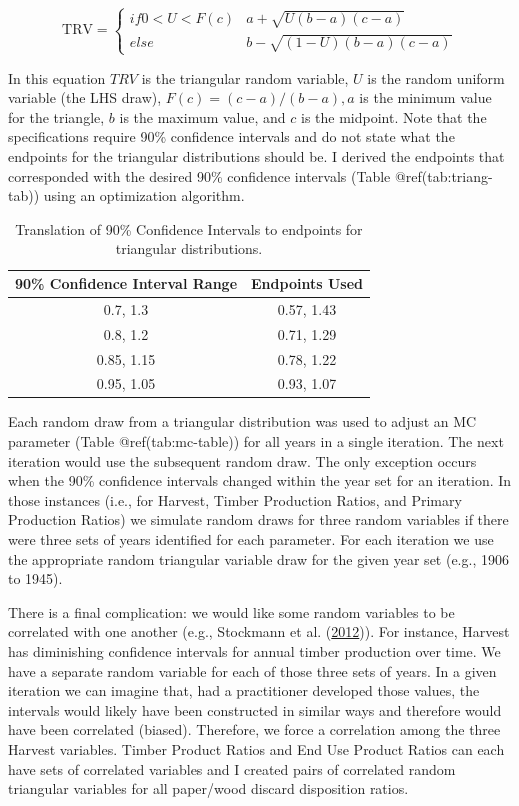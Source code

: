 \documentclass[
  openany]{book}
\begin{document}
\[   \text{TRV} =
  \begin{cases}
    if 0 < U < F(c)       & a + \sqrt{U(b-a)(c-a)}\\
    else  & b - \sqrt{(1-U)(b-a)(c-a)}
  \end{cases} \]

In this equation \(TRV\) is the triangular random variable, \(U\) is the
random uniform variable (the LHS draw), \(F(c)=(c-a)/(b-a), a\) is the
minimum value for the triangle, \(b\) is the maximum value, and \(c\) is
the midpoint. Note that the specifications require 90\% confidence
intervals and do not state what the endpoints for the triangular
distributions should be. I derived the endpoints that corresponded with
the desired 90\% confidence intervals (Table @ref(tab:triang-tab)) using
an optimization algorithm.

\begin{table}

\caption{\label{tab:triang-tab}Translation of 90\% Confidence Intervals to endpoints for triangular distributions.}
\centering
\begin{tabular}[t]{cc}
\toprule
90\% Confidence Interval Range & Endpoints Used\\
\midrule
0.7, 1.3 & 0.57, 1.43\\
0.8, 1.2 & 0.71, 1.29\\
0.85, 1.15 & 0.78, 1.22\\
0.95, 1.05 & 0.93, 1.07\\
\bottomrule
\end{tabular}
\end{table}

Each random draw from a triangular distribution was used to adjust an MC
parameter (Table @ref(tab:mc-table)) for all years in a single
iteration. The next iteration would use the subsequent random draw. The
only exception occurs when the 90\% confidence intervals changed within
the year set for an iteration. In those instances (i.e., for Harvest,
Timber Production Ratios, and Primary Production Ratios) we simulate
random draws for three random variables if there were three sets of
years identified for each parameter. For each iteration we use the
appropriate random triangular variable draw for the given year set
(e.g., 1906 to 1945).

There is a final complication: we would like some random variables to be
correlated with one another (e.g., Stockmann et al.
(\protect\hyperlink{ref-stockmann2012}{2012})). For instance, Harvest
has diminishing confidence intervals for annual timber production over
time. We have a separate random variable for each of those three sets of
years. In a given iteration we can imagine that, had a practitioner
developed those values, the intervals would likely have been constructed
in similar ways and therefore would have been correlated (biased).
Therefore, we force a correlation among the three Harvest variables.
Timber Product Ratios and End Use Product Ratios can each have sets of
correlated variables and I created pairs of correlated random triangular
variables for all paper/wood discard disposition ratios.
\end{document}

